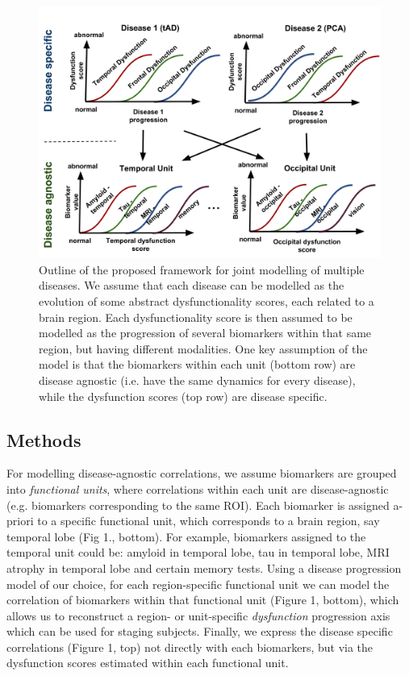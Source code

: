 \documentclass{llncs}
\begin{document}
\begin{figure}[h]
 \centering
 \includegraphics[width=\textwidth]{figures/disease_knowledge_transfer.png}
 \caption{Outline of the proposed framework for joint modelling of multiple diseases. We assume that each disease can be modelled as the evolution of some abstract dysfunctionality scores, each related to a brain region. Each dysfunctionality score is then assumed to be modelled as the progression of several biomarkers within that same region, but having different modalities. One key assumption of the model is that the biomarkers within each unit (bottom row) are disease agnostic (i.e. have the same dynamics for every disease), while the dysfunction scores (top row) are disease specific.}
\end{figure}

\subsection{Methods}

For modelling disease-agnostic correlations, we assume biomarkers are grouped into \emph{functional units}, where correlations within each unit are disease-agnostic (e.g. biomarkers corresponding to the same ROI).  Each biomarker is assigned a-priori to a specific functional unit, which corresponds to a brain region, say temporal lobe (Fig 1., bottom).  For example, biomarkers assigned to the temporal unit could be: amyloid in temporal lobe, tau in temporal lobe, MRI atrophy in temporal lobe and certain memory tests. Using a disease progression model of our choice, for each region-specific functional unit we can model the correlation of biomarkers within that functional unit (Figure 1, bottom), which allows us to reconstruct a region- or unit-specific \emph{dysfunction} progression axis which can be used for staging subjects. Finally, we express the disease specific correlations (Figure 1, top) not directly with each biomarkers, but via the dysfunction scores estimated within each functional unit.  
\end{document}
